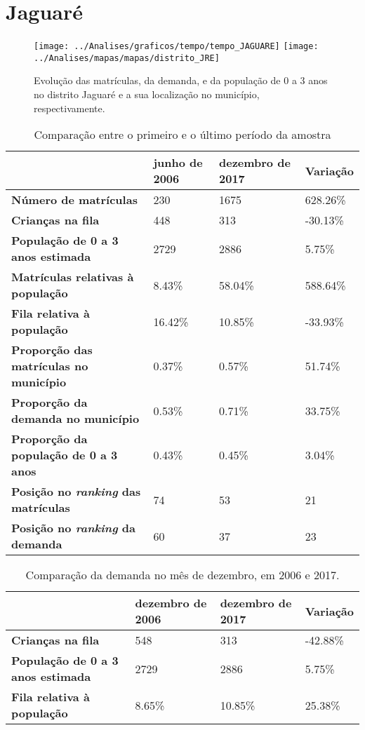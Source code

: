 \section{Jaguaré}
\begin{figure}[H]
\centering
\texttt{[image: ../Analises/graficos/tempo/tempo\_JAGUARE]}
\texttt{[image: ../Analises/mapas/mapas/distrito\_JRE]}
\caption{Evolução das matrículas, da demanda, e da população de 0 a 3 anos no distrito Jaguaré e a sua localização no município, respectivamente.}
\end{figure}
\begin{table}[H]
\begin{tabular}{l|l|l|l}
\textbf{}                                      & \textbf{junho de 2006}       & \textbf{dezembro de 2017}    & \textbf{Variação} \\ \hline
\textbf{Número de matrículas}                  & 230 & 1675 & 628.26\% \\ \hline
\textbf{Crianças na fila}                      & 448 & 313 & -30.13\% \\ \hline
\textbf{População de 0 a 3 anos estimada}      & 2729 & 2886 & 5.75\% \\ \hline
\textbf{Matrículas relativas à população}      & 8.43\% & 58.04\% & 588.64\% \\ \hline
\textbf{Fila relativa à população}             & 16.42\% & 10.85\% & -33.93\% \\ \hline
\textbf{Proporção das matrículas no município} & 0.37\% & 0.57\% & 51.74\% \\ \hline
\textbf{Proporção da demanda no município}     & 0.53\% & 0.71\% & 33.75\% \\ \hline
\textbf{Proporção da população de 0 a 3 anos}  & 0.43\% & 0.45\% & 3.04\% \\ \hline
\textbf{Posição no \textit{ranking} das matrículas}     & 74 & 53 & 21 \\ \hline
\textbf{Posição no \textit{ranking} da demanda}         & 60 & 37 & 23 \\ 
\end{tabular}
\caption{Comparação entre o primeiro e o último período da amostra}
\end{table}
\begin{table}[H]
\begin{tabular}{l|l|l|l}
\textbf{}                                 & \textbf{dezembro de 2006} & \textbf{dezembro de 2017} & \textbf{Variação} \\ \hline
\textbf{Crianças na fila}                      & 548 & 313 & -42.88\% \\ \hline
\textbf{População de 0 a 3 anos estimada}      & 2729 & 2886 & 5.75\% \\ \hline
\textbf{Fila relativa à população}             & 8.65\% & 10.85\% & 25.38\% \\
\end{tabular}
\caption{Comparação da demanda no mês de dezembro, em 2006 e 2017.}
\end{table}
